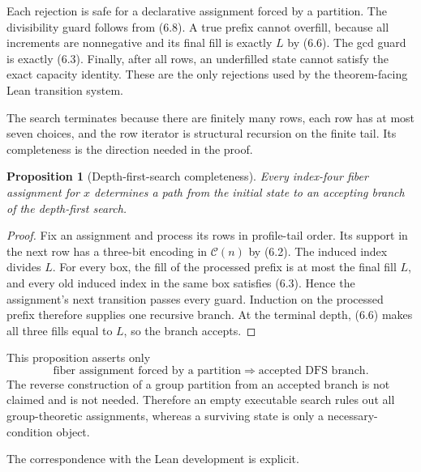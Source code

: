 \documentclass[11pt]{article}
\newtheorem{proposition}[theorem]{Proposition}
\theoremstyle{definition}
\begin{document}
Each rejection is safe for a declarative assignment forced by a partition.
The divisibility guard follows from (6.8). A true prefix cannot overfill,
because all increments are nonnegative and its final fill is exactly $L$ by
(6.6). The gcd guard is exactly (6.3). Finally, after all rows, an underfilled
state cannot satisfy the exact capacity identity. These are the only
rejections used by the theorem-facing Lean transition system.

The search terminates because there are finitely many rows, each row has at
most seven choices, and the row iterator is structural recursion on the finite
tail. Its completeness is the direction needed in the proof.

\begin{proposition}[Depth-first-search completeness]
\label{prop:fiber-search-complete}
Every index-four fiber assignment for $x$ determines a path from the initial
state to an accepting branch of the depth-first search.
\end{proposition}

\begin{proof}
Fix an assignment and process its rows in profile-tail order. Its support in
the next row has a three-bit encoding in $\mathcal C(n)$ by (6.2). The induced
index divides $L$. For every box, the fill of the processed prefix is at most
the final fill $L$, and every old induced index in the same box satisfies
(6.3). Hence the assignment's next transition passes every guard. Induction
on the processed prefix therefore supplies one recursive branch. At the
terminal depth, (6.6) makes all three fills equal to $L$, so the branch
accepts.
\end{proof}

This proposition asserts only
\[
  \text{fiber assignment forced by a partition}
  \Longrightarrow \text{accepted DFS branch}. \tag{6.13}
\]
The reverse construction of a group partition from an accepted branch is not
claimed and is not needed. Therefore an empty executable search rules out all
group-theoretic assignments, whereas a surviving state is only a necessary-
condition object.

The correspondence with the Lean development is explicit.
\end{document}
